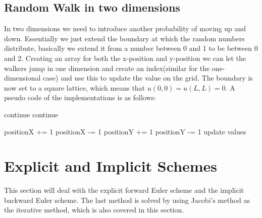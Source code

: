 \documentclass[a4paper,11pt]{article}
\newcommand{\vsp}{\vspace{0.2cm}} %
\newcommand{\secti}[1]{\centering \section{{#1}} \justifying} %
\begin{document}
\subsection{Random Walk in two dimensions}
    In two dimensions we need to introduce another probability of moving up and down. Essentially we just extend the boundary at which the random numbers distribute, basically we extend it from a number between 0 and 1 to be between 0 and 2. Creating an array for both the x-position and y-position we can let the walkers jump in one dimension and create an index(similar for the one-dimensional case) and use this to update the value on the grid. The boundary is now set to a square lattice, which means that $u(0,0)=u(L,L)=0$. A pseudo code of the implementations is as follows:\vsp
        \begin{algorithmic}
                        \State continue
                    \EndIf
                        \State continue
                    \EndIf

                        \State positionX += 1
                        \State positionX -= 1
                        \State positionY += 1
                    \Else
                        \State positionY -= 1
                    \EndIf
                    \State update values
                \EndFor
            \EndFor
        \end{algorithmic}

\secti{Explicit and Implicit Schemes}
    This section will deal with the explicit forward Euler scheme and the implicit backward Euler scheme. The last method is solved by using Jacobi's method as the iterative method, which is also covered in this section.
\end{document}
